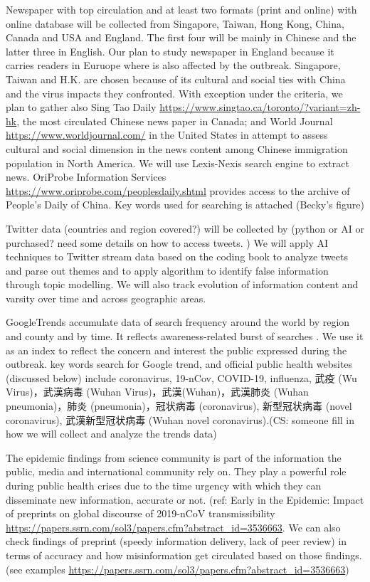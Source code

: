 Newspaper with top circulation and at least two formats (print and online) with online database will be collected from Singapore, Taiwan, Hong Kong, China, Canada and USA and England. The first four will be mainly in Chinese and the latter three in English.  Our plan to study newspaper in England because it carries readers in Euruope where is also affected by the outbreak.  Singapore, Taiwan and H.K. are chosen because of its cultural and social ties with China and the virus impacts they confronted.  With exception under the criteria, we plan to gather also Sing Tao Daily \url{https://www.singtao.ca/toronto/?variant=zh-hk}, the most circulated Chinese news paper in Canada; and World Journal \url{https://www.worldjournal.com/} in the United States in attempt to assess cultural and social dimension in the news content among Chinese immigration population in North America.  We will use Lexis-Nexis search engine to extract news.  OriProbe Information Services \url{https://www.oriprobe.com/peoplesdaily.shtml} provides access to the archive of People’s Daily of China.  Key words used for searching is attached (Becky’s figure) 

Twitter data (countries and region covered?) will be collected by (python or AI or purchased? need some details on how to access tweets. ) We will apply AI techniques to Twitter stream data based on the coding book to analyze tweets and parse out themes and to apply algorithm to identify false information through topic modelling.  We will also track evolution of information content and varsity over time and across geographic areas.
	
\begin{CJK*}{UTF8}{gbsn}
GoogleTrends accumulate data of search frequency around the world by region and county and by time.  It reflects awareness-related burst of searches \cite{BousAgac17, MahrBrag19}.  We use it as an index to reflect the concern and interest the public expressed during the outbreak.  key words search for Google trend, and official public health websites (discussed below) include coronavirus, 19-nCov, COVID-19, influenza, 武疫 (Wu Virus)，武漢病毒 (Wuhan Virus)，武漢(Wuhan)，武漢肺炎 (Wuhan pneumonia)，肺炎 (pneumonia)，冠状病毒 (coronavirus), 新型冠状病毒 (novel coronavirus), 武漢新型冠状病毒 (Wuhan novel coronavirus).(CS:  someone fill in how we will collect and analyze the trends data)
\end{CJK*}

The epidemic findings from science community is part of the information the public, media and international community rely on. They play a powerful role during public health crises due to the time urgency with which they can disseminate new information, accurate or not. (ref: Early in the Epidemic: Impact of preprints on global discourse of 2019-nCoV transmissibility \url{https://papers.ssrn.com/sol3/papers.cfm?abstract_id=3536663}.  We can also check findings of preprint (speedy information delivery, lack of peer review) in terms of accuracy and how misinformation get circulated based on those findings. (see examples \url{https://papers.ssrn.com/sol3/papers.cfm?abstract_id=3536663})

